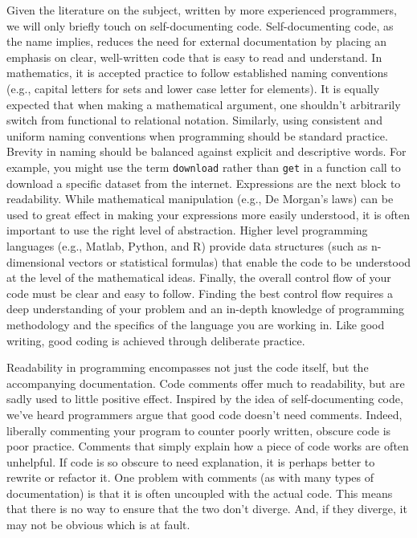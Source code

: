 \documentclass[ChapterTOCs,krantz2]{krantz} %
\begin{document}
Given the literature on the subject, written by more experienced programmers,
we will only briefly touch on self-documenting code. Self-documenting code, as
the name implies, reduces the need for external documentation by placing an
emphasis on clear, well-written code that is easy to read and understand.  In
mathematics, it is accepted practice to follow established naming conventions
(e.g., capital letters for sets and lower case letter for elements). It is
equally expected that when making a mathematical argument, one shouldn't
arbitrarily switch from functional to relational notation.  Similarly, using
consistent and uniform naming conventions when programming should be standard
practice. Brevity in naming should be balanced against explicit and descriptive
words. For example, you might use the term \texttt{download} rather than
\texttt{get} in a function call to download a specific dataset from the
internet. Expressions are the next block to readability. While mathematical
manipulation (e.g., De Morgan's laws) can be used to great effect in making
your expressions more easily understood, it is often important to use the right
level of abstraction. Higher level programming languages (e.g., Matlab, Python,
and R) provide data structures (such as n-dimensional vectors or statistical
formulas) that enable the code to be understood at the level of the
mathematical ideas. Finally, the overall control flow of your code must be
clear and easy to follow. Finding the best control flow requires a deep
understanding of your problem and an in-depth knowledge of programming
methodology and the specifics of the language you are working in. Like good
writing, good coding is achieved through deliberate practice.

Readability in programming encompasses not just the code itself,
but the accompanying documentation. Code comments offer much to readability,
but are sadly used to little positive effect. Inspired by the idea of
self-documenting code, we've heard programmers argue that good code doesn't
need comments. Indeed, liberally commenting your program to counter poorly
written, obscure code is poor practice. Comments that simply explain how a piece
of code works are often unhelpful. If code is so obscure to need explanation,
it is perhaps better to rewrite or refactor it. One problem with comments (as
with many types of documentation) is that it is often uncoupled with the actual
code. This means that there is no way to ensure that the two don't diverge.
And, if they diverge, it may not be obvious which is at fault.
\end{document}
